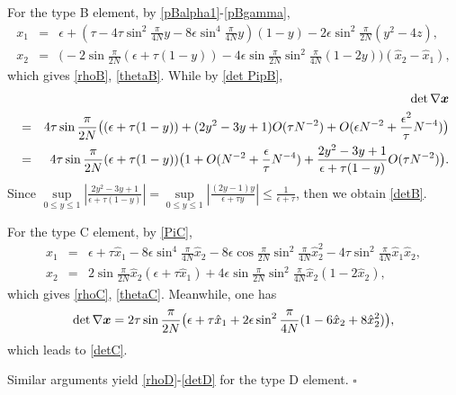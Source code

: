 \documentclass[12pt]{article}
\renewcommand{\vec}[1]{\mbox{\boldmath$#1$}}
\numberwithin{equation}{section}
\begin{document}
For the type B element, by \eqref{pBalpha1}-\eqref{pBgamma},
\begin{eqnarray*}
x_1&=&\epsilon+(\tau-4\tau \sin^2\frac{\pi}{4N}y-8\epsilon \sin^4 \frac{\pi}{4N}y)(1-y)-
2\epsilon \sin^2\frac{\pi}{2N}(y^2-4z),\\
x_2&=&\big(-2\sin \frac{\pi}{2N}(\epsilon+\tau (1-y))-4\epsilon \sin \frac{\pi}{2N}
\sin^2 \frac{\pi}{4N}(1-2y)\big)(\hat{x}_2-\hat{x}_1),
\end{eqnarray*}
which gives \eqref{rhoB}, \eqref{thetaB}. While by \eqref{det PipB},
\begin{eqnarray*}
&&\det \nabla \vec{x}\\
&=&4\tau \sin \frac{\pi}{2N}\big((\epsilon+\tau (1-y))+(2y^2-3y+1)O(\tau N^{-2})+
O(\epsilon N^{-2}+\frac{\epsilon^2}{\tau}N^{-4})\big)\\
&=&4\tau \sin \frac{\pi}{2N}(\epsilon+\tau (1-y))\big(1+O(N^{-2}+
\frac{\epsilon}{\tau}N^{-4})+\frac{2y^2-3y+1}{\epsilon+\tau(1-y)}
O(\tau N^{-2})\big).
\end{eqnarray*}
Since $\sup\limits_{0\le y\le 1}|\frac{2y^2-3y+1}{\epsilon+\tau(1-y)}|=
\sup\limits_{0\le y\le 1}|\frac{(2y-1)y}{\epsilon+\tau y}|\le \frac{1}{\epsilon+\tau}$,
then we obtain \eqref{detB}.

For the type C element, by \eqref{PiC},
\begin{eqnarray*}
x_1&=&\epsilon+\tau \hat{x}_1-8\epsilon \sin^4 {\frac{\pi}{4N}}\hat{x}_2
-8\epsilon \cos {\frac{\pi}{2N}}\sin^2 {\frac{\pi}{4N}}\hat{x}_2^2
-4\tau \sin^2 \frac{\pi}{4N}\hat{x}_1\hat{x}_2,\\
x_2&=&2\sin \frac{\pi}{2N}\hat{x}_2(\epsilon+\tau \hat{x}_1)+
4\epsilon \sin \frac{\pi}{2N}\sin^2 \frac{\pi}{4N}\hat{x}_2(1-2\hat{x}_2),
\end{eqnarray*}
which gives \eqref{rhoC}, \eqref{thetaC}. Meanwhile, one has
$$\det \nabla \vec{x}=2\tau \sin \frac{\pi}{2N}\big(\epsilon+\tau \hat{x}_1
+2\epsilon \sin^2 {\frac{\pi}{4N}}(1-6\hat{x}_2+8\hat{x}_2^2)\big),$$
which leads to \eqref{detC}.

Similar arguments yield \eqref{rhoD}-\eqref{detD} for the type D element.
\hfill $\square$
\end{document}
